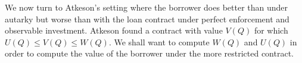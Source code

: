 We now turn to Atkeson's  setting where  the borrower does
better than under autarky but worse than with the
loan contract under perfect enforcement and observable
investment.  Atkeson found a contract
with value $V(Q)$ for which $U(Q) \leq V(Q) \leq W(Q)$.
We shall want to compute $W(Q)$ and $U(Q)$ in order to
compute the value of the borrower
under the more    restricted contract.




%
